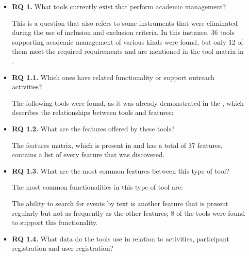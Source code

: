 \begin{itemize}
  \item \textbf{RQ 1.} What tools currently exist that perform academic management?

        This is a question that also refers to some instruments that were eliminated during the use of inclusion and exclusion criteria. In this instance, 36 tools supporting academic management of various kinds were found, but only 12 of them meet the required requirements and are mentioned in the tool matrix in .
  \item \textbf{RQ 1.1.} Which ones have related functionality or support outreach activities?

        The following tools were found, as it was already demonstrated in the , which describes the relationships between tools and features:

  \item \textbf{RQ 1.2.} What are the features offered by these tools?

        The features matrix, which is present in  and has a total of 37 features, contains a list of every feature that was discovered.
  \item \textbf{RQ 1.3.} What are the most common features between this type of tool?

        The most common functionalities in this type of tool are:
        The ability to search for events by text is another feature that is present regularly but not as frequently as the other features; 8 of the tools were found to support this functionality.
  \item \textbf{RQ 1.4.} What data do the tools use in relation to activities, participant registration and user registration?


\end{itemize}
